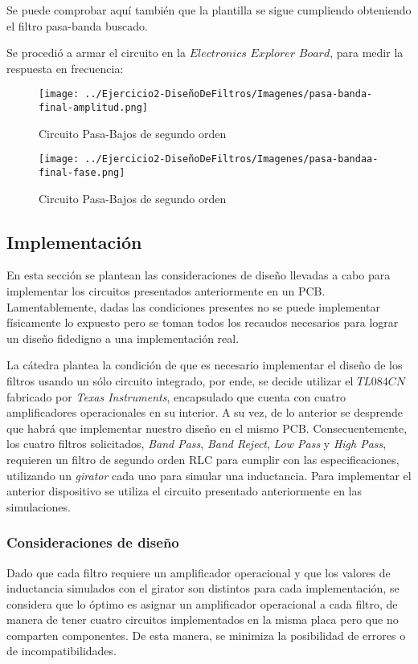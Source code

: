Se puede comprobar aquí también que la plantilla se sigue cumpliendo obteniendo el filtro pasa-banda buscado.

Se procedió a armar el circuito en la $Electronics$ $Explorer$ $Board$, para medir la respuesta en frecuencia:

\begin{figure}[H]
    \centering
    \texttt{[image: ../Ejercicio2-DiseñoDeFiltros/Imagenes/pasa-banda-final-amplitud.png]}
    \caption{Circuito Pasa-Bajos de segundo orden}
\end{figure}

\begin{figure}[H]
    \centering
    \texttt{[image: ../Ejercicio2-DiseñoDeFiltros/Imagenes/pasa-bandaa-final-fase.png]}
    \caption{Circuito Pasa-Bajos de segundo orden}
\end{figure}

\subsection{Implementación}


En esta sección se plantean las consideraciones de diseño llevadas a cabo para implementar los circuitos presentados anteriormente 
en un PCB. Lamentablemente, dadas las condiciones presentes no se puede implementar físicamente lo expuesto pero se toman todos los 
recaudos necesarios para lograr un diseño fidedigno a una implementación real. \par 

La cátedra plantea la condición de que es necesario implementar el diseño de los filtros usando un sólo circuito integrado, por ende, se 
decide utilizar el $TL084CN$ fabricado por \textit{Texas Instruments},
 encapsulado que cuenta con cuatro amplificadores operacionales en su interior. A su vez, de lo anterior se desprende que habrá que implementar 
 nuestro diseño en el mismo PCB.
Consecuentemente, los cuatro filtros solicitados, \textit{Band Pass}, \textit{Band Reject}, \textit{Low Pass} y \textit{High Pass}, requieren un 
filtro de segundo orden RLC para cumplir con las especificaciones, utilizando un \textit{girator} cada uno para simular una inductancia. Para 
implementar el anterior dispositivo se utiliza el circuito presentado anteriormente en las simulaciones. \par 

\subsubsection{Consideraciones de diseño}
Dado que cada filtro requiere un amplificador operacional y que los valores de inductancia simulados con el girator son distintos para cada implementación,
se considera que lo óptimo es asignar un amplificador operacional a cada filtro, de manera de tener cuatro circuitos implementados en
 la misma placa pero que no comparten 
componentes. De esta manera, se minimiza la posibilidad de errores o de incompatibilidades. \par 

